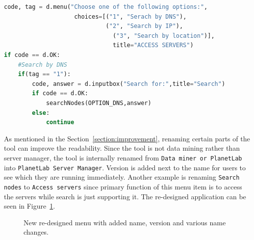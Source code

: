 \begin{minipage}{\linewidth}
\begin{lstlisting}[language=Python, numbers=none, label={lst:constant}, caption=Example of Constant Usage, frame=single, showstringspaces=false, breaklines=true]
code, tag = d.menu("Choose one of the following options:",
					choices=[("1", "Serach by DNS"),
				      		 ("2", "Search by IP"),
					    	   ("3", "Search by location")],
						       title="ACCESS SERVERS")
if code == d.OK:
	#Search by DNS
	if(tag == "1"):
		code, answer = d.inputbox("Search for:",title="Search")
		if code == d.OK:
			searchNodes(OPTION_DNS,answer)
		else:
			continue
\end{lstlisting}
\end{minipage}

As mentioned in the Section~\ref{section:improvement}, renaming certain parts of the tool can improve the readability. Since the tool is not data mining rather than server manager, the tool is internally renamed from \texttt{Data miner or PlanetLab} into \texttt{PlanetLab Server Manager}. Version is added next to the name for users to see which they are running immediately. Another example is renaming \texttt{Search nodes} to \texttt{Access servers} since primary function of this menu item is to access the servers while search is just supporting it. The re-designed application can be seen in Figure~\ref{fig:redesigned}.\\

\begin{figure}[H]
	\centering
	\caption{New re-designed menu with added name, version and various name changes.}
	\label{fig:redesigned}
\end{figure}

